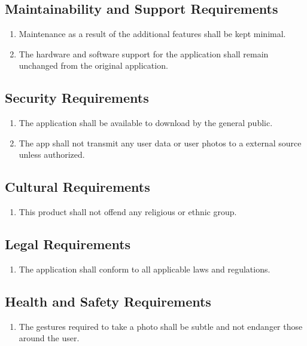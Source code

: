 \documentclass[12pt, titlepage]{article}
\begin{document}
\subsection{Maintainability and Support Requirements}
\begin{enumerate}[{MS}1. ]
	\item Maintenance as a result of the additional features shall be kept minimal.
	\item The hardware and software support for the application shall remain unchanged from the original application.
\end{enumerate}

\subsection{Security Requirements}
\begin{enumerate}[{SR}1. ]
	\item The application shall be available to download by the general public.
	\item The app shall not transmit any user data or user photos to a external source unless authorized.
\end{enumerate}

\subsection{Cultural Requirements}
\begin{enumerate}[{CP}1. ]
	\item This product shall not offend any religious or ethnic group.
\end{enumerate}

\subsection{Legal Requirements}
\begin{enumerate}[{LR}1. ]
	\item The application shall conform to all applicable laws and regulations.
\end{enumerate}

\subsection{Health and Safety Requirements}
\begin{enumerate}[{HS}1. ]
	\item The gestures required to take a photo shall be subtle and not endanger those around the user. 
\end{enumerate}
\end{document}
